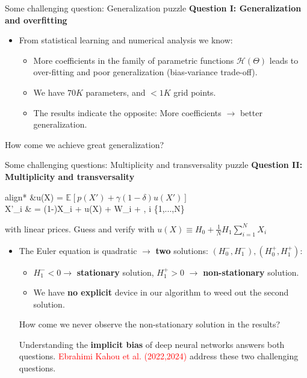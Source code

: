 \documentclass[aspectratio=169,10pt]{beamer}
\newcommand{\emphcolor}[1]{\textbf{\textcolor{emphcolorval}{#1}}}
\newcommand{\expec}[2][]{\ensuremath{\mathbb{E}_{{#1}}\left[ {#2} \right]}}
\begin{document}
\begin{frame}{Some challenging question: Generalization puzzle}
	\emphcolor{Question I: Generalization and overfitting}
	\begin{itemize}
		\item From statistical learning and numerical analysis we know:\vspace{0.1in}
		\begin{itemize}
			\item More coefficients in the family of parametric functions $\mathcal{H}(\Theta)$ leads to over-fitting and poor generalization (bias-variance trade-off).\vspace{0.1in}
		  \item We have $70K$ parameters, and $<1K$ grid points.\vspace{0.1in}
			\item The results indicate the opposite: More coefficients $\rightarrow$ better generalization.  \vspace{0.1in}
		\end{itemize}
	\end{itemize}
How come we achieve great generalization?  
\end{frame}

\begin{frame}{Some challenging questions: Multiplicity and transversality puzzle}
\emphcolor{Question II: Multiplicity and transversality} 
	\begin{empheq}[box=\tcbhighmath]{align*}
		&\gamma u(X) = \beta \expec{p(X')+\gamma (1-\delta) u(X') }\\
		  X'_i & = (1-\delta)X_i + u(X) + \sigma W_i + \eta \omega,\quad{} i \in \{1,...,N\}
	\end{empheq}
with linear prices. Guess and verify with $u(X) \equiv H_0 + \frac{1}{N} H_1 \sum_{i=1}^N X_i$  
\begin{itemize}
		\item The Euler equation is quadratic $\rightarrow$ \emphcolor{two} solutions: $(H_0^-, H_1^-), (H_0^+, H_1^+)$:\vspace{0.1in}
	\begin{itemize}
		\item $H_1^- <0 \rightarrow$  \emphcolor{stationary} solution, $H_1^+ > 0$ $\rightarrow$ \emphcolor{non-stationary} solution. \vspace{0.1in}
		\item We have \emphcolor{no explicit} device in our algorithm to weed out the second solution. \vspace{0.1in}
	\end{itemize}
	How come we never observe the non-stationary solution in the results? 
	\vspace{0.1in}
	
	Understanding the \emphcolor{implicit bias} of deep neural networks answers both questions.  \textcolor{red}{Ebrahimi Kahou et al. (2022,2024)} address these two challenging questions. 
\end{itemize}
\end{frame}	
				
\end{document}
